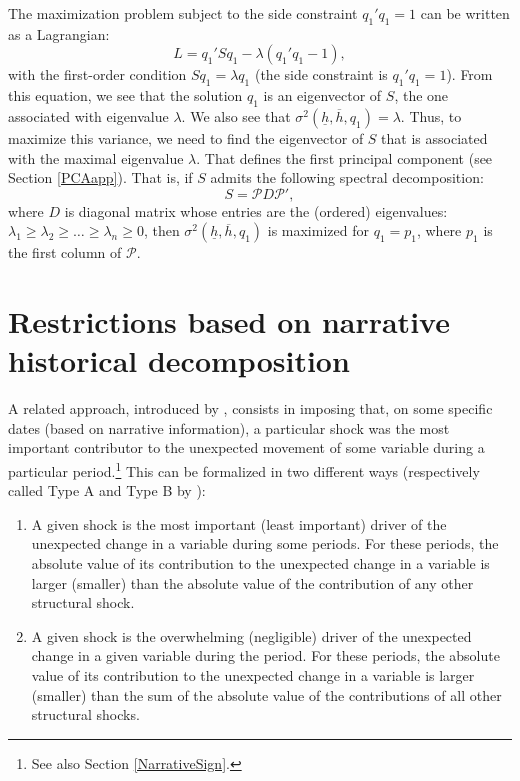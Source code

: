 \documentclass[
  12pt,
]{book}
\providecommand{\tightlist}{%
  \setlength{\itemsep}{0pt}\setlength{\parskip}{0pt}}
\theoremstyle{definition}
\theoremstyle{definition}
\theoremstyle{definition}
\theoremstyle{definition}
\theoremstyle{remark}
\begin{document}
The maximization problem subject to the side constraint \(q_1'q_1=1\) can be written as a Lagrangian: \[
L=q_1'Sq_1-\lambda(q_1'q_1-1),
\]
with the first-order condition \(Sq_1=\lambda q_1\) (the side constraint is \(q_1'q_1=1\)). From this equation, we see that the solution \(q_1\) is an eigenvector of \(S\), the one associated with eigenvalue \(\lambda\). We also see that \(\sigma^2(\underline{h},\overline{h},q_1)=\lambda\). Thus, to maximize this variance, we need to find the eigenvector of \(S\) that is associated with the maximal eigenvalue \(\lambda\). That defines the first principal component (see Section \ref{PCAapp}). That is, if \(S\) admits the following spectral decomposition:
\[
S = \mathcal{P}D\mathcal{P}',
\]
where \(D\) is diagonal matrix whose entries are the (ordered) eigenvalues: \(\lambda_1 \ge \lambda_2 \ge \dots \ge \lambda_n \ge 0\), then \(\sigma^2(\underline{h},\overline{h},q_1)\) is maximized for \(q_1 = p_1\), where \(p_1\) is the first column of \(\mathcal{P}\).

\hypertarget{NarrativeHistDecomp}{%
\section{Restrictions based on narrative historical decomposition}\label{NarrativeHistDecomp}}

A related approach, introduced by \citet{AntolinDiaz_RubioRamirez_2018}, consists in imposing that, on some specific dates (based on narrative information), a particular shock was the most important contributor to the unexpected movement of some variable during a particular period.\footnote{See also Section \ref{NarrativeSign}.} This can be formalized in two different ways (respectively called Type A and Type B by \citet{AntolinDiaz_RubioRamirez_2018}):

\begin{enumerate}
\def\labelenumi{\arabic{enumi}.}
\tightlist
\item
  A given shock is the most important (least important) driver of the unexpected change in a variable during some periods. For these periods, the absolute value of its contribution to the unexpected change in a variable is larger (smaller) than the absolute value of the contribution of any other structural shock.
\item
  A given shock is the overwhelming (negligible) driver of the unexpected change in a given variable during the period. For these periods, the absolute value of its contribution to the unexpected change in a variable is larger (smaller) than the sum of the absolute value of the contributions of all other structural shocks.
\end{enumerate}
\end{document}
